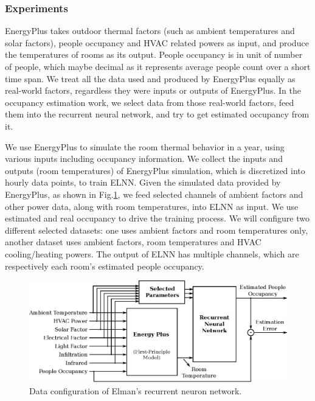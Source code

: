 \subsubsection{Experiments}
EnergyPlus takes outdoor thermal factors (such as ambient temperatures and solar
factors), people occupancy and HVAC related powers as input, and produce the
temperatures of rooms as its output. People occupancy is in unit of number of
people, which maybe decimal as it represents average people count over a short
time span. We treat all the data used and produced by EnergyPlus equally as
real-world factors, regardless they were inputs or outputs of EnergyPlus. In the
occupancy estimation work, we select data from those real-world factors, feed
them into the recurrent neural network, and try to get estimated occupancy from
it.

We use EnergyPlus to simulate the room thermal behavior in a year, using various
inputs including occupancy information. We collect the inputs and outputs (room
temperatures) of EnergyPlus simulation, which is discretized into hourly data
points, to train ELNN. Given the simulated data
provided by EnergyPlus, as shown in Fig.\ref{fig:data-flow}, we feed selected
channels of ambient factors and other power data, along with room temperatures,
into ELNN as input. We use estimated and real
occupancy to drive the training process. We will configure two different
selected datasets: one uses ambient factors and room temperatures only, another
dataset uses ambient factors, room temperatures and HVAC cooling/heating
powers. The output of ELNN has multiple channels, which are
respectively each room's estimated people occupancy.

\begin{figure}[t]
    \centering
    \includegraphics[width=0.9\columnwidth]{figs/rnn/data-flow.eps}
    \caption{Data configuration of Elman's recurrent neuron network.}
    \label{fig:data-flow}
\end{figure}

